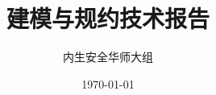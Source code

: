 \documentclass[UTF8,a4paper,12pt,oneside]{book}
\begin{document}
\title{\heiti 建模与规约技术报告}
\author{\kaishu 内生安全华师大组}
\date{\today}

\frontmatter
\maketitle
\tableofcontents

\mainmatter







\backmatter
\end{document}
